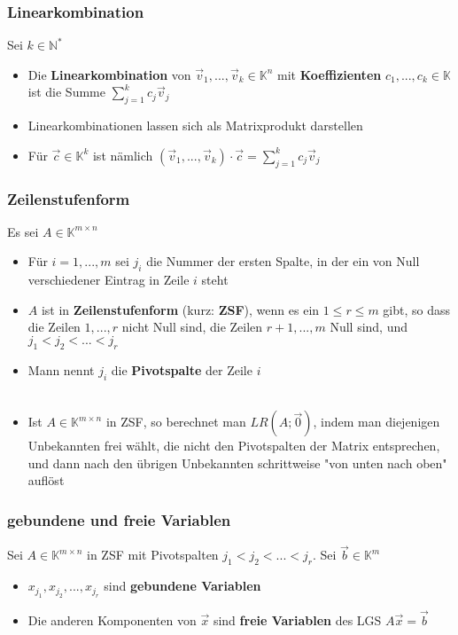 \documentclass[titlepage]{article}
\newcommand{\K}{\mathbb{K}}
\newcommand{\N}{\mathbb{N}}
\newcommand{\1}{\mathbb{1}}
\newcommand{\0}{\mathbb{0}}
\begin{document}
				\subsubsection{Linearkombination}
					Sei $k\in\N^*$
					\begin{itemize}
						\item Die \textbf{Linearkombination} von $\vec{v}_1,...,\vec{v}_k\in\K^n$ mit \textbf{Koeffizienten} $c_1,...,c_k\in\K$ ist die Summe $\sum\limits^k_{j=1}c_j\vec{v}_j$
						\item Linearkombinationen lassen sich als Matrixprodukt darstellen
						\item Für $\vec{c}\in\K^k$ ist nämlich $(\vec{v}_1,...,\vec{v}_k)\cdot\vec{c}=\sum\limits^k_{j=1}c_j\vec{v}_j$
					\end{itemize}
				\subsubsection{Zeilenstufenform}
					Es sei $A\in\K^{m\times n}$
					\begin{itemize}
						\item Für $i=1,...,m$ sei $j_i$ die Nummer der ersten Spalte, in der ein von Null verschiedener Eintrag in Zeile $i$ steht
						\item $A$ ist in \textbf{Zeilenstufenform} (kurz: \textbf{ZSF}), wenn es ein $1\le r\le m$ gibt, so dass die Zeilen $1,...,r$ nicht Null sind, die Zeilen $r+1,...,m$ Null sind, und $j_1<j_2<...<j_r$
						\item Mann nennt $j_i$ die \textbf{Pivotspalte} der Zeile $i$\\\\
						\item Ist $A\in\K^{m\times n}$ in ZSF, so berechnet man $LR(A;\vec{0})$, indem man diejenigen Unbekannten frei wählt, die nicht den Pivotspalten der Matrix entsprechen, und dann nach den übrigen Unbekannten schrittweise "von unten nach oben" auflöst
					\end{itemize}
				\subsubsection{gebundene und freie Variablen}
					Sei $A\in\K^{m\times n}$ in ZSF mit Pivotspalten $j_1<j_2<...<j_r$. Sei $\vec{b}\in\K^m$
					\begin{itemize}
						\item $x_{j_1},x_{j_2},...,x_{j_r}$ sind \textbf{gebundene Variablen}
						\item Die anderen Komponenten von $\vec{x}$ sind \textbf{freie Variablen} des LGS $A\vec{x}=\vec{b}$
					\end{itemize}
\end{document}

